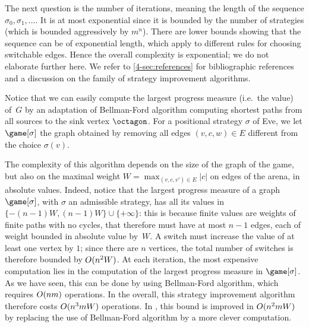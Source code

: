 The next question is the number of iterations, meaning the length of the sequence
$\sigma_0,\sigma_1,\dots$. It is at most exponential since it is bounded by the number of strategies (which is bounded aggressively by $m^n$).
There are lower bounds showing that the sequence can be of exponential length, which apply to different rules for choosing switchable edges.
Hence the overall complexity is exponential; we do not elaborate further here. 
We refer to \cref{4-sec:references} for bibliographic references and a discussion on the family of strategy improvement algorithms.

Notice that we can easily compute the largest progress measure
(i.e.~the value) of~$G$ by an adaptation of Bellman-Ford algorithm
computing shortest paths from all sources to the sink vertex
$\octagon$. For a positional strategy $\sigma$ of Eve, we let
$\game[\sigma]$ the graph obtained by removing all edges
$(v,c,w)\in E$ different from the choice $\sigma(v)$. 


The complexity of this algorithm depends on the size of the graph of
the game, but also on the maximal weight
$W = \max_{(v,c,v')\in E} |c|$ on edges of the arena, in absolute
values. Indeed, notice that the largest progress measure of a graph
$\game[\sigma]$, with $\sigma$ an admissible strategy, has all its
values in $\{-(n-1)W,(n-1)W\}\cup\{+\infty\}$: this is because
finite values are weights of finite paths with no cycles, that
therefore must have at most $n-1$ edges, each of weight bounded in
absolute value by~$W$. A switch must increase the value of at
least one vertex by $1$; since there are $n$ vertices, the total
number of switches is therefore bounded by $O(n^2W)$. At
each iteration, the most expensive computation lies in the computation
of the largest progress measure in $\game[\sigma]$. As we have seen,
this can be done by using Bellman-Ford algorithm, which requires
$O(nm)$ operations. In the overall, this strategy
improvement algorithm therefore costs $O(n^3mW)$
operations. In \cite[Section 6]{Bjorklund&Vorobyov:2007}, this bound
is improved in $O(n^2 mW)$ by replacing the use of
Bellman-Ford algorithm by a more clever computation.


